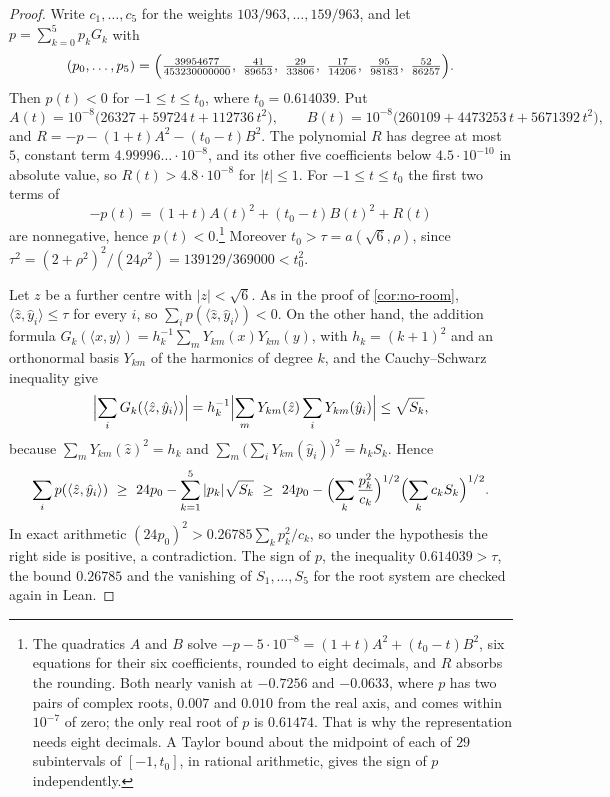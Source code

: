 \documentclass[11pt,reqno]{amsart}
\renewcommand{\_}{\origunderscore\allowbreak}
\numberwithin{equation}{section}
\theoremstyle{plain}
\theoremstyle{definition}
\theoremstyle{remark}
\begin{document}
\begin{proof}
Write $c_1,\dots,c_5$ for the weights $103/963,\dots,159/963$, and let
$p=\sum_{k=0}^5p_kG_k$ with
\[
  (p_0,\dots,p_5)=\Bigl(\tfrac{39954677}{453230000000},\ \tfrac{41}{89653},\
  \tfrac{29}{33806},\ \tfrac{17}{14206},\ \tfrac{95}{98183},\
  \tfrac{52}{86257}\Bigr).
\]
Then $p(t)<0$ for $-1\le t\le t_0$, where $t_0=0.614039$. Put
\[
  A(t)=10^{-8}\bigl(26327+59724\,t+112736\,t^2\bigr),\qquad
  B(t)=10^{-8}\bigl(260109+4473253\,t+5671392\,t^2\bigr),
\]
and $R=-p-(1+t)A^2-(t_0-t)B^2$. The polynomial $R$ has degree at most $5$,
constant term $4.99996\ldots\cdot10^{-8}$, and its other five coefficients
below $4.5\cdot10^{-10}$ in absolute value, so $R(t)>4.8\cdot10^{-8}$ for
$|t|\le1$. For $-1\le t\le t_0$ the first two terms of
\[
  -p(t)=(1+t)A(t)^2+(t_0-t)B(t)^2+R(t)
\]
are nonnegative, hence $p(t)<0$.\footnote{ The quadratics $A$ and $B$ solve
  $-p-5\cdot10^{-8}=(1+t)A^2+(t_0-t)B^2$, six equations for their six
  coefficients, rounded to eight decimals, and $R$ absorbs the rounding. Both nearly vanish at $-0.7256$ and $-0.0633$, where $p$ has two
  pairs of complex roots, $0.007$ and $0.010$ from the real axis, and comes
  within $10^{-7}$ of zero; the only real root of $p$ is $0.61474$. That is
  why the representation needs eight decimals. A Taylor bound about the
  midpoint of each of $29$ subintervals of $[-1,t_0]$, in rational arithmetic,
  gives the sign of $p$ independently.} Moreover $t_0>\tau=a(\sqrt6,\rho)$,
since $\tau^2=(2+\rho^2)^2/(24\rho^2)=139129/369000<t_0^2$.

Let $z$ be a further centre with $|z|<\sqrt6$. As in the proof of
\cref{cor:no-room}, $\langle\hat z,\hat y_i\rangle\le\tau$ for every $i$,
so $\sum_ip(\langle\hat z,\hat y_i\rangle)<0$. On the other hand, the
addition formula $G_k(\langle x,y\rangle)=h_k^{-1}\sum_mY_{km}(x)Y_{km}(y)$,
with $h_k=(k+1)^2$ and an orthonormal basis $Y_{km}$ of the harmonics of
degree $k$, and the Cauchy--Schwarz inequality give
\[
  \Bigl|\sum_iG_k(\langle\hat z,\hat y_i\rangle)\Bigr|
  =h_k^{-1}\Bigl|\sum_mY_{km}(\hat z)\sum_iY_{km}(\hat y_i)\Bigr|
  \le\sqrt{S_k},
\]
because $\sum_mY_{km}(\hat z)^2=h_k$ and
$\sum_m\bigl(\sum_iY_{km}(\hat y_i)\bigr)^2=h_kS_k$. Hence
\[
  \sum_ip(\langle\hat z,\hat y_i\rangle)
  \ \ge\ 24p_0-\sum_{k=1}^5|p_k|\sqrt{S_k}
  \ \ge\ 24p_0-\Bigl(\sum_k\frac{p_k^2}{c_k}\Bigr)^{1/2}
          \Bigl(\sum_kc_kS_k\Bigr)^{1/2}.
\]
In exact arithmetic $(24p_0)^2>0.26785\sum_kp_k^2/c_k$, so under the
hypothesis the right side is positive, a contradiction. The sign of $p$, the
inequality $0.614039>\tau$, the bound $0.26785$ and the vanishing of
$S_1,\dots,S_5$ for the root system are checked again in Lean.
\end{proof}
\end{document}

